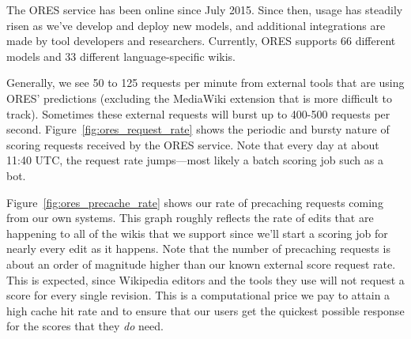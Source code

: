 The ORES service has been online since July 2015\cite{halfaker2015artificial}.  Since then, usage has steadily risen as we've develop and deploy new models, and additional integrations are made by tool developers and researchers.  Currently, ORES supports 66 different models and 33 different language-specific wikis.

Generally, we see 50 to 125 requests per minute from external tools that are using ORES' predictions (excluding the MediaWiki extension that is more difficult to track).  Sometimes these external requests will burst up to 400-500 requests per second.  Figure~\ref{fig:ores_request_rate} shows the periodic and bursty nature of scoring requests received by the ORES service.  Note that every day at about 11:40 UTC, the request rate jumps---most likely a batch scoring job such as a bot.

Figure~\ref{fig:ores_precache_rate} shows our rate of precaching requests coming from our own systems.  This graph roughly reflects the rate of edits that are happening to all of the wikis that we support since we'll start a scoring job for nearly every edit as it happens.  Note that the number of precaching requests is about an order of magnitude higher than our known external score request rate.  This is expected, since Wikipedia editors and the tools they use will not request a score for every single revision.  This is a computational price we pay to attain a high cache hit rate and to ensure that our users get the quickest possible response for the scores that they \emph{do} need.
